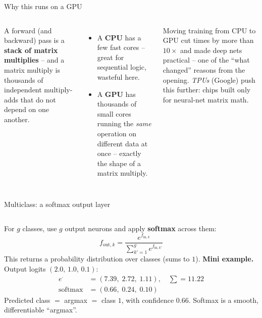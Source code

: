 \documentclass[aspectratio=169]{beamer}
\begin{document}
\begin{frame}{Why this runs on a GPU}
  \begin{columns}[T]
    A forward (and backward) pass is a \textbf{stack of matrix multiplies} -- and a matrix
    multiply is thousands of independent multiply-adds that do not depend on one another.
    \vskip 6pt
    \begin{itemize}\small
      \item A \textbf{CPU} has a few fast cores -- great for sequential logic, wasteful here.
      \item A \textbf{GPU} has thousands of small cores running the \emph{same} operation on
        different data at once -- exactly the shape of a matrix multiply.
    \end{itemize}
    \vskip 4pt
    Moving training from CPU to GPU cut times by more than $10\times$ and made deep nets
    practical -- one of the ``what changed'' reasons from the opening.
    \vskip 4pt
    \footnotesize \emph{TPUs} (Google) push this further: chips built only for neural-net matrix
    math.
  \end{columns}
\end{frame}

\begin{frame}{Multiclass: a softmax output layer}
  \begin{columns}[T]
    For $g$ classes, use $g$ output neurons and apply \textbf{softmax} across them:
    \[
      f_{\text{out},k} = \frac{e^{f_{\text{in},k}}}{\sum_{k'=1}^{g} e^{f_{\text{in},k'}}}
    \]
    This returns a probability distribution over classes (sums to $1$).
    \vskip 4pt
    \footnotesize \textbf{Mini example.} Output logits $(2.0,\,1.0,\,0.1)$:
    \begin{align*}
      e^{\cdot} &= (7.39,\; 2.72,\; 1.11),\quad \textstyle\sum = 11.22\\
      \text{softmax} &= (0.66,\; 0.24,\; 0.10)
    \end{align*}
    Predicted class $=$ argmax $=$ class $1$, with confidence $0.66$. Softmax is a smooth,
    differentiable ``argmax''.
  \end{columns}
\end{frame}
\end{document}
